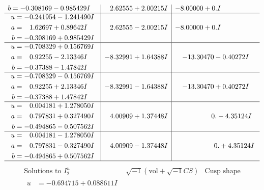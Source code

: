 \documentclass[1p]{elsarticle_modified}
\theoremstyle{definition}
\newcommand{\I}{\sqrt{-1}}
\begin{document}
$$\begin{array}{c|c|c}
\begin{aligned}
b &= -0.308169 - 0.985429 I\end{aligned}
 & \phantom{-}2.62555 + 2.00215 I & -8.00000 + 0. I\phantom{ +0.000000I} \\ \hline\begin{aligned}
u &= -0.241954 - 1.241490 I \\
a &= \phantom{-}1.62697 + 0.89642 I \\
b &= -0.308169 + 0.985429 I\end{aligned}
 & \phantom{-}2.62555 - 2.00215 I & -8.00000 + 0. I\phantom{ +0.000000I} \\ \hline\begin{aligned}
u &= -0.708329 + 0.156769 I \\
a &= \phantom{-}0.92255 - 2.13346 I \\
b &= -0.37388 - 1.47842 I\end{aligned}
 & -8.32991 + 1.64388 I & -13.30470 - 0.40272 I \\ \hline\begin{aligned}
u &= -0.708329 - 0.156769 I \\
a &= \phantom{-}0.92255 + 2.13346 I \\
b &= -0.37388 + 1.47842 I\end{aligned}
 & -8.32991 - 1.64388 I & -13.30470 + 0.40272 I \\ \hline\begin{aligned}
u &= \phantom{-}0.004181 + 1.278050 I \\
a &= \phantom{-}0.797831 + 0.327490 I \\
b &= -0.494865 - 0.507562 I\end{aligned}
 & \phantom{-}4.00909 + 1.37448 I & \phantom{-0.000000 } 0. - 4.35124 I \\ \hline\begin{aligned}
u &= \phantom{-}0.004181 - 1.278050 I \\
a &= \phantom{-}0.797831 - 0.327490 I \\
b &= -0.494865 + 0.507562 I\end{aligned}
 & \phantom{-}4.00909 - 1.37448 I & \phantom{-0.000000 -}0. + 4.35124 I\\
 \hline 
 \end{array}$$\newpage$$\begin{array}{c|c|c}  
\text{Solutions to }I^u_{2}& \I (\text{vol} + \sqrt{-1}CS) & \text{Cusp shape}\\
 \hline 
\begin{aligned}
u &= -0.694715 + 0.088611 I \\

\end{aligned}
\end{array}$$
\end{document}
